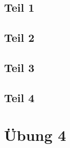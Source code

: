 \documentclass[a4paper,10pt]{article}
\begin{document}
\subsection*{Teil 1}

\subsection*{Teil 2}

\subsection*{Teil 3}

\subsection*{Teil 4}

\section*{Übung 4}
\end{document}

